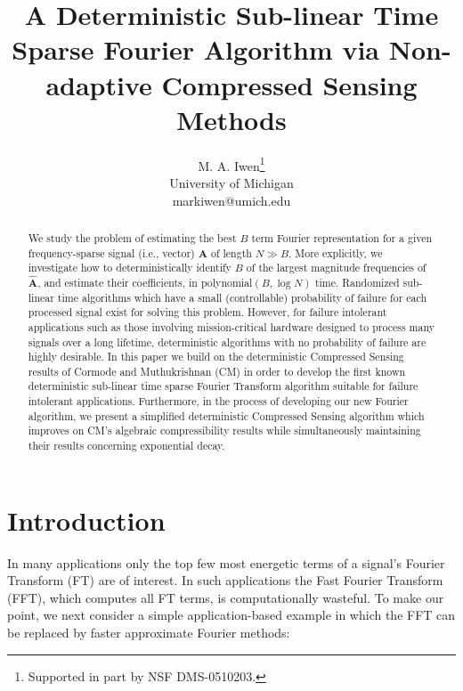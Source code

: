\documentclass{article}
\begin{document}
\pagestyle{empty}

\title{A Deterministic Sub-linear Time Sparse Fourier Algorithm via Non-adaptive Compressed Sensing Methods}
\author{M. A. Iwen\thanks{Supported in part by NSF DMS-0510203.}\\
University of Michigan\\
markiwen@umich.edu}

\maketitle
\thispagestyle{empty}

\begin{abstract}
We study the problem of estimating the best $B$ term Fourier representation for a given frequency-sparse signal (i.e., vector) $\textbf{A}$ of length $N \gg B$.  More explicitly, we investigate how to deterministically identify $B$ of the largest magnitude frequencies of $\hat{\textbf{A}}$, and estimate their coefficients, in polynomial$(B,\log N)$ time.  Randomized sub-linear time algorithms which have a small (controllable) probability of failure for each processed signal exist for solving this problem.  However, for failure intolerant applications such as those involving mission-critical hardware designed to process many signals over a long lifetime, deterministic algorithms with no probability of failure are highly desirable.  In this paper we build on the deterministic Compressed Sensing results of Cormode and Muthukrishnan (CM) \cite{CMDetCS3,CMDetCS1,CMDetCS2} in order to develop the first known deterministic sub-linear time sparse Fourier Transform algorithm suitable for failure intolerant applications.  Furthermore, in the process of developing our new Fourier algorithm, we present a simplified deterministic Compressed Sensing algorithm which improves on CM's algebraic compressibility results while simultaneously maintaining their results concerning exponential decay.
\end{abstract}

\section{Introduction}

In many applications only the top few most energetic terms of a signal's Fourier Transform (FT) are of interest.  In such applications the Fast Fourier Transform (FFT), which computes all FT terms, is computationally wasteful.  To make our point, we next consider a simple application-based example in which the FFT can be replaced by faster approximate Fourier methods:\\
\end{document}
